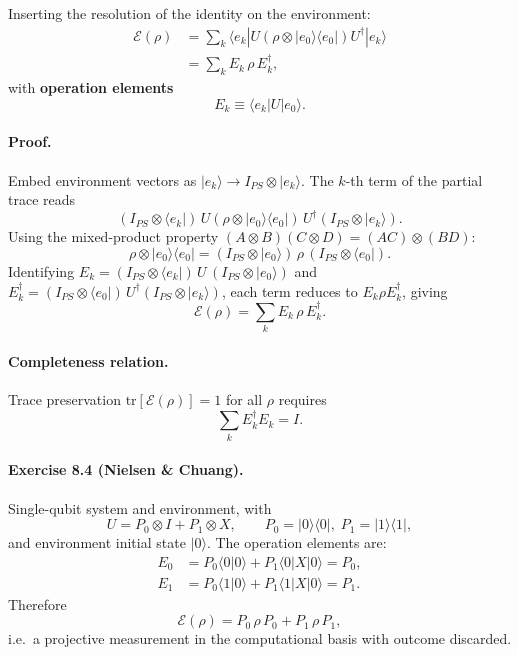\documentclass[10pt,a4paper]{article}
\begin{document}
Inserting the resolution of the identity on the environment:
\begin{align}
\mathcal{E}(\rho) &= \sum_k \langle e_k| U(\rho \otimes |e_0\rangle\langle e_0|)U^\dagger |e_k\rangle \\
&= \sum_k E_k \,\rho\, E_k^\dagger,
\end{align}
with \textbf{operation elements}
\begin{equation}
E_k \equiv \langle e_k| U |e_0\rangle.
\end{equation}

\paragraph{Proof.}
Embed environment vectors as $|e_k\rangle \to I_{PS}\otimes|e_k\rangle$. The $k$-th term of the partial trace reads
\begin{equation}
(I_{PS}\otimes\langle e_k|)\,U(\rho\otimes|e_0\rangle\langle e_0|)\,U^\dagger(I_{PS}\otimes|e_k\rangle).
\end{equation}
Using the mixed-product property $(A\otimes B)(C\otimes D)=(AC)\otimes(BD)$:
\begin{equation}
\rho\otimes|e_0\rangle\langle e_0| = (I_{PS}\otimes|e_0\rangle)\,\rho\,(I_{PS}\otimes\langle e_0|).
\end{equation}
Identifying $E_k = (I_{PS}\otimes\langle e_k|)\,U\,(I_{PS}\otimes|e_0\rangle)$ and $E_k^\dagger = (I_{PS}\otimes\langle e_0|)\,U^\dagger(I_{PS}\otimes|e_k\rangle)$, each term reduces to $E_k\rho E_k^\dagger$, giving
\begin{equation}
\boxed{\;\mathcal{E}(\rho) = \sum_k E_k\,\rho\,E_k^\dagger.\;}
\end{equation}

\paragraph{Completeness relation.}
Trace preservation $\mathrm{tr}[\mathcal{E}(\rho)]=1$ for all $\rho$ requires
\begin{equation}
\sum_k E_k^\dagger E_k = I.
\end{equation}

\paragraph{Exercise 8.4 (Nielsen \& Chuang).}
Single-qubit system and environment, with
\begin{equation}
U = P_0\otimes I + P_1\otimes X, \qquad P_0=|0\rangle\langle 0|,\; P_1=|1\rangle\langle 1|,
\end{equation}
and environment initial state $|0\rangle$. The operation elements are:
\begin{align}
E_0 &= P_0\langle 0|0\rangle + P_1\langle 0|X|0\rangle = P_0, \\
E_1 &= P_0\langle 1|0\rangle + P_1\langle 1|X|0\rangle = P_1.
\end{align}
Therefore
\begin{equation}
\boxed{\;\mathcal{E}(\rho) = P_0\,\rho\,P_0 + P_1\,\rho\,P_1,\;}
\end{equation}
i.e.\ a projective measurement in the computational basis with outcome discarded. 
\end{document}
